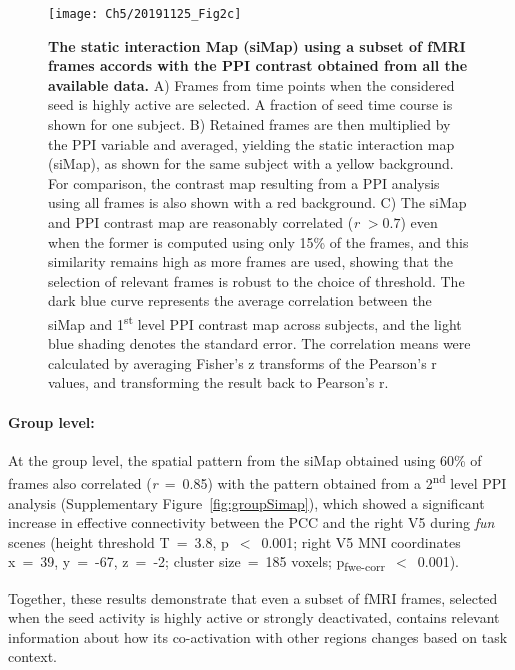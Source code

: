 \begin{figure}[t]
\centering
\texttt{[image: Ch5/20191125\_Fig2c]}
\caption{\textbf{The static interaction Map (siMap) using a subset of fMRI frames accords with the PPI contrast obtained from all the available data.} A) Frames from time points when the considered seed is highly active are selected. A fraction of seed time course is shown for one subject. B) Retained frames are then multiplied by the PPI variable and averaged, yielding the static interaction map (siMap), as shown for the same subject with a yellow background. For comparison, the contrast map resulting from a PPI analysis using all frames is also shown with a red background. C) The siMap and PPI contrast map are reasonably correlated (\textit{r} $>0.7$) even when the former is computed using only 15\% of the frames, and this similarity remains high as more frames are used, showing that the selection of relevant frames is robust to the choice of threshold. The dark blue curve represents the average correlation between the siMap and 1\textsuperscript{st} level PPI contrast map across subjects, and the light blue shading denotes the standard error. The correlation means were calculated by averaging Fisher's z transforms of the Pearson's r values, and transforming the result back to Pearson's r.}
\label{fig:PPI_CAPs_Fig2}
\end{figure}



\paragraph{Group level: } At the group level, the spatial pattern from the siMap obtained using 60\% of frames also correlated (\textit{r}~=~0.85) with the  pattern obtained from a 2\textsuperscript{nd} level PPI analysis (Supplementary Figure~\ref{fig:groupSimap}), which showed a significant increase in effective connectivity between the PCC and the right V5 during \textit{fun} scenes (height threshold T~=~3.8, p~$<$~0.001; right V5 MNI coordinates x~=~39, y~=~-67, z~=~-2; cluster size~=~185 voxels;  p\textsubscript{fwe-corr}~$<$~0.001). 

Together, these results demonstrate that even a subset of fMRI frames, selected when the seed activity is highly active or strongly deactivated, contains relevant information about how its co-activation with other regions changes based on task context.



